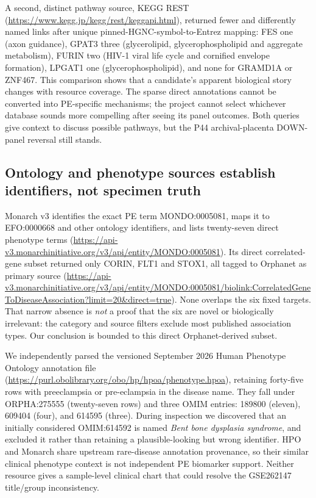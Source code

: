 \documentclass[11pt,a4paper]{article}
\begin{document}
A second, distinct pathway source, KEGG REST (\url{https://www.kegg.jp/kegg/rest/keggapi.html}), returned fewer and differently named links after unique pinned-HGNC-symbol-to-Entrez mapping: FES one (axon guidance), GPAT3 three (glycerolipid, glycerophospholipid and aggregate metabolism), FURIN two (HIV-1 viral life cycle and cornified envelope formation), LPGAT1 one (glycerophospholipid), and none for GRAMD1A or ZNF467. This comparison shows that a candidate's apparent biological story changes with resource coverage. The sparse direct annotations cannot be converted into PE-specific mechanisms; the project cannot select whichever database sounds more compelling after seeing its panel outcomes. Both queries give context to discuss possible pathways, but the P44 archival-placenta DOWN-panel reversal still stands.

\subsection{Ontology and phenotype sources establish identifiers, not specimen truth}
Monarch v3 identifies the exact PE term MONDO:0005081, maps it to EFO:0000668 and other ontology identifiers, and lists twenty-seven direct phenotype terms (\url{https://api-v3.monarchinitiative.org/v3/api/entity/MONDO:0005081}). Its direct correlated-gene subset returned only CORIN, FLT1 and STOX1, all tagged to Orphanet as primary source (\url{https://api-v3.monarchinitiative.org/v3/api/entity/MONDO:0005081/biolink:CorrelatedGeneToDiseaseAssociation?limit=20&direct=true}). None overlaps the six fixed targets. That narrow absence is \emph{not} a proof that the six are novel or biologically irrelevant: the category and source filters exclude most published association types. Our conclusion is bounded to this direct Orphanet-derived subset.

We independently parsed the versioned September 2026 Human Phenotype Ontology annotation file (\url{https://purl.obolibrary.org/obo/hp/hpoa/phenotype.hpoa}), retaining forty-five rows with preeclampsia or pre-eclampsia in the disease name. They fall under ORPHA:275555 (twenty-seven rows) and three OMIM entries: 189800 (eleven), 609404 (four), and 614595 (three). During inspection we discovered that an initially considered OMIM:614592 is named \emph{Bent bone dysplasia syndrome}, and excluded it rather than retaining a plausible-looking but wrong identifier. HPO and Monarch share upstream rare-disease annotation provenance, so their similar clinical phenotype context is not independent PE biomarker support. Neither resource gives a sample-level clinical chart that could resolve the GSE262147 title/group inconsistency.
\end{document}
